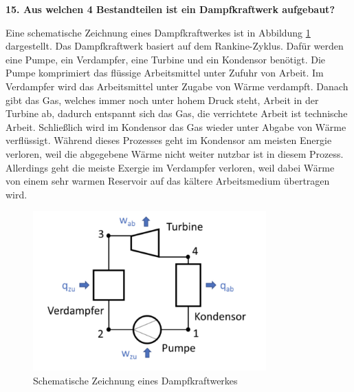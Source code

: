 \noindent \textbf{15. Aus welchen 4 Bestandteilen ist ein Dampfkraftwerk aufgebaut?}\\
\begin{addmargin}[25pt]{0pt}
Eine schematische Zeichnung eines Dampfkraftwerkes ist in Abbildung \ref{fig:Dampfkraftwerk} dargestellt. Das Dampfkraftwerk basiert auf dem Rankine-Zyklus. Dafür werden eine Pumpe, ein Verdampfer, eine Turbine und ein Kondensor benötigt. Die Pumpe komprimiert das flüssige Arbeitsmittel unter Zufuhr von Arbeit. Im Verdampfer wird das Arbeitsmittel unter Zugabe von Wärme verdampft. Danach gibt das Gas, welches immer noch unter hohem Druck steht, Arbeit in der Turbine ab, dadurch entspannt sich das Gas, die verrichtete Arbeit ist technische Arbeit. Schließlich wird im Kondensor das Gas wieder unter Abgabe von Wärme verflüssigt. Während dieses Prozesses geht im Kondensor am meisten Energie verloren, weil die abgegebene Wärme nicht weiter nutzbar ist in diesem Prozess. Allerdings geht die meiste Exergie im Verdampfer verloren, weil dabei Wärme von einem sehr warmen Reservoir auf das kältere Arbeitsmedium übertragen wird.\\
\begin{figure}[h]
    \centering
    \includegraphics[width = 0.8\textwidth]{images/Energiewissenschaften/Dampfkraftwerk.jpeg}
    \caption{Schematische Zeichnung eines Dampfkraftwerkes}
    \label{fig:Dampfkraftwerk}
\end{figure}\\
\end{addmargin}


